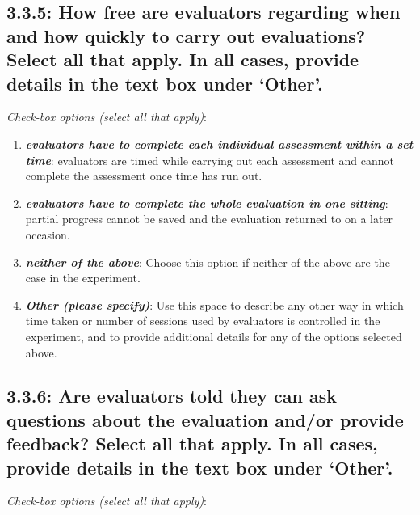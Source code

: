 \documentclass[11pt,a4paper]{article}
\newcommand{\egcvalue}[1]{\textbf{\textit{#1}}}
\begin{document}
\subsection*{3.3.5: How free are evaluators regarding when and how quickly to carry out evaluations? Select all that apply. In all cases, provide details in the text box under `Other'.}

\noindent\textit{Check-box options (select all that apply)}:  
\vspace{-.1cm}

\begin{enumerate}[itemsep=0cm,leftmargin=0.5cm,label={\small $\square$}]
    \item \egcvalue{evaluators have to complete each individual assessment within a set time}: evaluators are timed while carrying out each assessment and cannot complete the assessment once time has run out.
    \item \egcvalue{evaluators have to complete the whole evaluation in one sitting}: partial progress cannot be saved and the evaluation returned to on a later occasion.
    \item \egcvalue{neither of the above}: Choose this option if neither of the above are the case in the experiment.
    \item \egcvalue{Other (please specify)}: Use this space to describe any other way in which time taken or number of sessions used by evaluators is controlled in the experiment, and to provide additional details for any of the options selected above.
\end{enumerate}

\subsection*{3.3.6: Are evaluators told they can ask questions about the evaluation and/or provide feedback? Select all that apply. In all cases, provide details in the text box under `Other'.}

\noindent\textit{Check-box options (select all that apply)}:  
\vspace{-.1cm}
\end{document}
